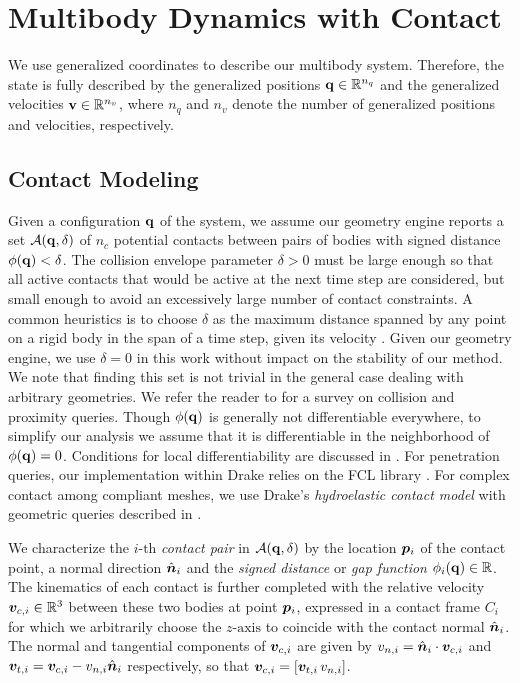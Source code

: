 \section{Multibody Dynamics with Contact}
\label{sec:multibody_dynamics_with_contact}

We use generalized coordinates to describe our multibody system. Therefore, the
state is fully described by the generalized positions
${\mathbf{q}}\in\mathbb{R}^{n_q}$ and the generalized velocities
${\mathbf{v}}\in\mathbb{R}^{n_v}$, where $n_q$ and $n_v$ denote the number of
generalized positions and velocities, respectively.

\subsection{Contact Modeling}
\label{sec:contact_modeling}

Given a configuration ${\mathbf{q}}$ of the system, we assume our geometry engine
reports a set $\mathcal{A}({\mathbf{q}},\delta)$ of $n_c$ potential contacts between
pairs of bodies with signed distance $\phi({\mathbf{q}}) < \delta$. The collision
envelope parameter $\delta > 0$ must be large enough so that all active contacts
that would be active at the next time step are considered, but small enough to
avoid an excessively large number of contact constraints. A common heuristics is
to choose $\delta$ as the maximum distance spanned by any point on a rigid body
in the span of a time step, given its velocity \cite{bib:anitescu2010}. Given
our geometry engine, we use $\delta = 0$ in this work without impact on the
stability of our method. We note that finding this set is not trivial in the
general case dealing with arbitrary geometries. We refer the reader to
\cite{bib:hadap2004collision,bib:lin2017collision, bib:erleben2018methodology,
bib:flores2021contact} for a survey on collision and proximity queries. Though
$\phi({\mathbf{q}})$ is generally not differentiable everywhere, to simplify our
analysis we assume that it is differentiable in the neighborhood of
$\phi({\mathbf{q}}) = 0$. Conditions for local differentiability are discussed in
\cite{bib:anitescu2004constraint}. For penetration queries, our implementation
within Drake \cite{bib:drake} relies on the FCL library \cite{bib:fcl}. For
complex contact among compliant meshes, we use Drake's \emph{hydroelastic
contact model} with geometric queries described in \cite{bib:elandt2019pressure,
bib:masterjohn2021discrete}.

We characterize the $i\text{-th}$ \emph{contact pair} in
$\mathcal{A}({\mathbf{q}},\delta)$ by the location ${\bm{p}}_i$ of the contact point, a
normal direction $\hat{{\bm{n}}}_i$ and the \emph{signed distance} or \emph{gap
function} $\phi_i({\mathbf{q}})\in\mathbb{R}$. The kinematics of each contact is
further completed with the relative velocity ${\bm{v}}_{c,i}\in\mathbb{R}^3$
between these two bodies at point ${\bm{p}}_i$, expressed in a contact frame $C_i$
for which we arbitrarily choose the $z\text{-axis}$ to coincide with the contact
normal $\hat{{\bm{n}}}_i$. The normal and tangential components of ${\bm{v}}_{c,i}$
are given by $v_{n,i} = \hat{{\bm{n}}}_i\cdot{\bm{v}}_{c,i}$ and ${\bm{v}}_{t,i} =
{\bm{v}}_{c,i}-v_{n,i}\hat{{\bm{n}}}_i$ respectively, so that
${\bm{v}}_{c,i}=[{\bm{v}}_{t,i}\,v_{n,i}]$.

